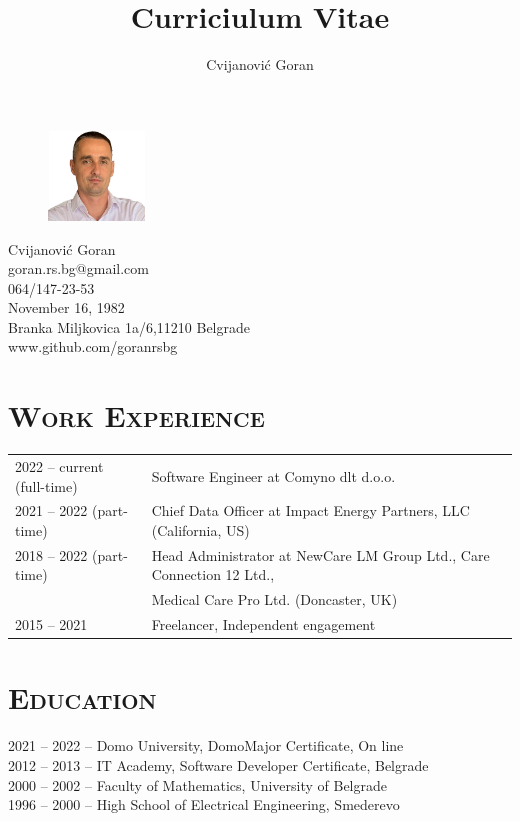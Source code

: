 \documentclass{article}
\author{Cvijanović Goran}
\title{Curriciulum Vitae}
\begin{document}
\begin{figure}
\centering
\includegraphics[width=73pt]{photo.png}
\end{figure}

\begin{spacing}{1.05}
\noindent
Cvijanović Goran \\
goran.rs.bg@gmail.com \\
064/147-23-53 \\
November 16, 1982 \\
Branka Miljkovica 1a/6,11210 Belgrade  \\
www.github.com/goranrsbg \\
\end{spacing}

\section{\textsc{Work Experience}}

\begin{tabular}{l | l} 
2022 -- current (full-time) & Software Engineer at Comyno dlt d.o.o.\\
2021 -- 2022 (part-time)  & Chief Data Officer at Impact Energy Partners, LLC (California, US)\\
2018 -- 2022 (part-time)  & Head Administrator at NewCare LM Group Ltd., Care Connection 12 Ltd.,\\
                                         & Medical Care Pro Ltd. (Doncaster, UK)\\
2015 -- 2021                    & Freelancer, Independent engagement
\end{tabular}

\section{\textsc{Education}}

2021 -- 2022 -- Domo University, DomoMajor Certificate, On line \\
2012 -- 2013 -- IT Academy, Software Developer Certificate, Belgrade \\
2000 -- 2002 -- Faculty of Mathematics, University of Belgrade \\
1996 -- 2000 -- High School of Electrical Engineering, Smederevo
\end{document}
